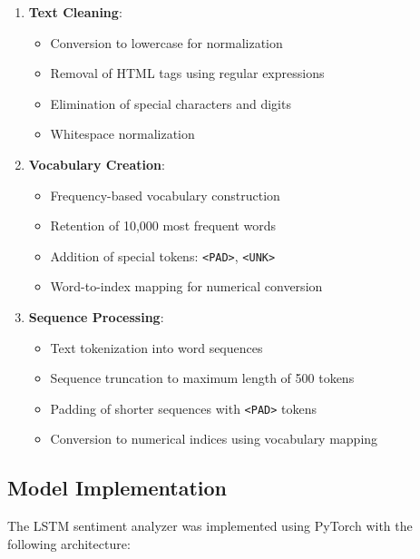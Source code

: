 \documentclass[a4paper, journal]{IEEEtran}
\begin{document}
\begin{enumerate}
    \item \textbf{Text Cleaning}: 
    \begin{itemize}
        \item Conversion to lowercase for normalization
        \item Removal of HTML tags using regular expressions
        \item Elimination of special characters and digits
        \item Whitespace normalization
    \end{itemize}
    
    \item \textbf{Vocabulary Creation}:
    \begin{itemize}
        \item Frequency-based vocabulary construction
        \item Retention of 10,000 most frequent words
        \item Addition of special tokens: \texttt{<PAD>}, \texttt{<UNK>}
        \item Word-to-index mapping for numerical conversion
    \end{itemize}
    
    \item \textbf{Sequence Processing}:
    \begin{itemize}
        \item Text tokenization into word sequences
        \item Sequence truncation to maximum length of 500 tokens
        \item Padding of shorter sequences with \texttt{<PAD>} tokens
        \item Conversion to numerical indices using vocabulary mapping
    \end{itemize}
\end{enumerate}

\subsection{Model Implementation}

The LSTM sentiment analyzer was implemented using PyTorch with the following architecture:
\end{document}
